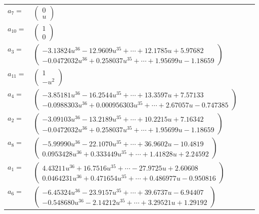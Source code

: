 \documentclass[1p]{elsarticle_modified}
\theoremstyle{definition}
\begin{document}
\begin{tabular}{m{7pt} m{180pt} m{7pt} m{180pt} }
\flushright $a_{7}=$&$\begin{pmatrix}0\\u\end{pmatrix}$ \\
\flushright $a_{10}=$&$\begin{pmatrix}1\\0\end{pmatrix}$ \\
\flushright $a_{3}=$&$\begin{pmatrix}-3.13824 u^{36}-12.9609 u^{35}+\cdots+12.1785 u+5.97682\\-0.0472032 u^{36}+0.258037 u^{35}+\cdots+1.95699 u-1.18659\end{pmatrix}$ \\
\flushright $a_{11}=$&$\begin{pmatrix}1\\- u^2\end{pmatrix}$ \\
\flushright $a_{4}=$&$\begin{pmatrix}-3.85181 u^{36}-16.2544 u^{35}+\cdots+13.3597 u+7.57133\\-0.0988303 u^{36}+0.000956303 u^{35}+\cdots+2.67057 u-0.747385\end{pmatrix}$ \\
\flushright $a_{2}=$&$\begin{pmatrix}-3.09103 u^{36}-13.2189 u^{35}+\cdots+10.2215 u+7.16342\\-0.0472032 u^{36}+0.258037 u^{35}+\cdots+1.95699 u-1.18659\end{pmatrix}$ \\
\flushright $a_{8}=$&$\begin{pmatrix}-5.99990 u^{36}-22.1070 u^{35}+\cdots+36.9602 u-10.4819\\0.0953428 u^{36}+0.333449 u^{35}+\cdots+1.41828 u+2.24592\end{pmatrix}$ \\
\flushright $a_{1}=$&$\begin{pmatrix}4.43211 u^{36}+16.7516 u^{35}+\cdots-27.9725 u+2.60608\\0.0464231 u^{36}+0.471654 u^{35}+\cdots+0.486977 u-0.950816\end{pmatrix}$ \\
\flushright $a_{6}=$&$\begin{pmatrix}-6.45324 u^{36}-23.9157 u^{35}+\cdots+39.6737 u-6.94407\\-0.548680 u^{36}-2.14212 u^{35}+\cdots+3.29521 u+1.29192\end{pmatrix}$ \\

\end{tabular}
\end{document}

